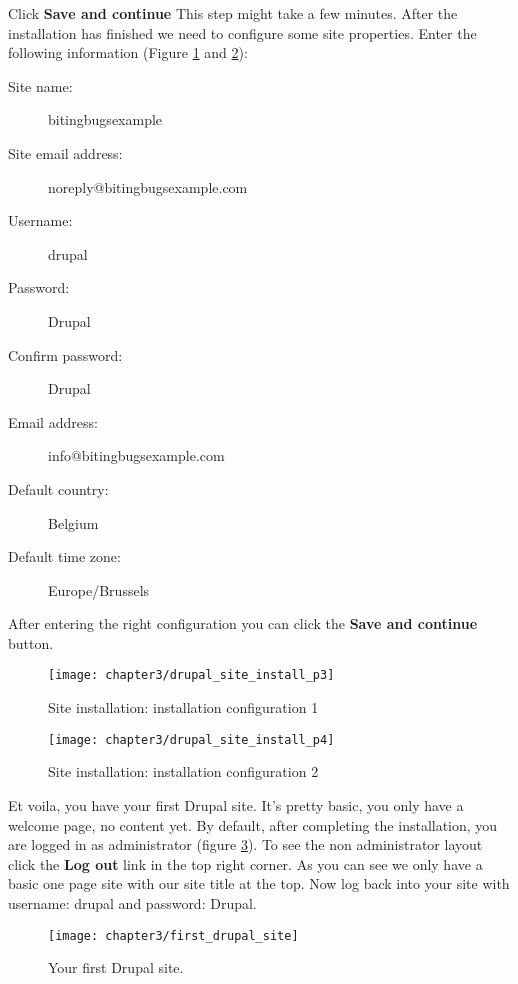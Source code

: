   Click \textbf{Save and continue} This step might take a few minutes. After the installation has finished we need to configure some site properties. Enter the following information (Figure \ref{fig:drupal_site_install_p3} and \ref{fig:drupal_site_install_p4}):
  
  \begin{description}
  	\item[Site name:] bitingbugsexample
  	\item[Site email address:] noreply@bitingbugsexample.com
  	\item[Username:] drupal
  	\item[Password:] Drupal
  	\item[Confirm password:] Drupal
  	\item[Email address:] info@bitingbugsexample.com
  	\item[Default country:] Belgium
  	\item[Default time zone:] Europe/Brussels
  \end{description}
  
  After entering the right configuration you can click the \textbf{Save and continue} button.
  
  \begin{figure}[H]
  	\centering
  	\texttt{[image: chapter3/drupal\_site\_install\_p3]}
  	\caption{Site installation: installation configuration 1}
  	\label{fig:drupal_site_install_p3}
  \end{figure}
  \begin{figure}[H]
  	\centering
  	\texttt{[image: chapter3/drupal\_site\_install\_p4]}
  	\caption{Site installation: installation configuration 2}
  	\label{fig:drupal_site_install_p4}
  \end{figure}
  
  Et voila, you have your first Drupal site. It's pretty basic, you only have a welcome page, no content yet. By default, after completing the installation, you are logged in as administrator (figure \ref{fig:first_drupal_site}). To see the non administrator layout click the \textbf{Log out} link in the top right corner. As you can see we only have a basic one page site with our site title at the top. Now log back into your site with username: drupal and password: Drupal.
  
  
  \begin{figure}[H]
  	\centering
  	\texttt{[image: chapter3/first\_drupal\_site]}
  	\caption{Your first Drupal site.}
  	\label{fig:first_drupal_site}
  \end{figure}
  
